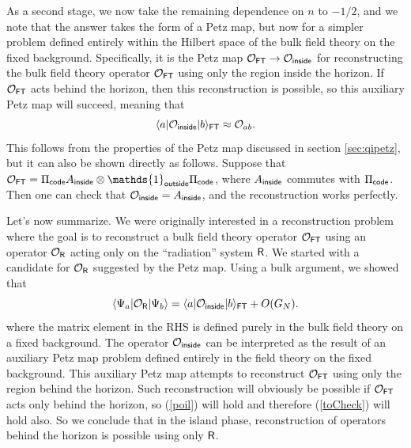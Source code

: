 \documentclass[11pt]{article}
\newcommand{\be}{\begin{equation}}
\newcommand{\ee}{\end{equation}}
\numberwithin{equation}{section}
\begin{document}
As a second stage, we now take the remaining dependence on $n$ to $-1/2$, and we note that the answer takes the form of a Petz map, but now for a simpler problem defined entirely within the Hilbert space of the bulk field theory on the fixed background. Specifically, it is the Petz map $\mathcal{O}_{\sf{FT}}\rightarrow \mathcal{O}_{\sf{inside}}$ for reconstructing the bulk field theory operator $\mathcal{O}_{\sf{FT}}$ using only the region inside the horizon. If $\mathcal{O}_{\sf{FT}}$ acts behind the horizon, then this reconstruction is possible, so this auxiliary Petz map will succeed, meaning that
\be
\langle a|\mathcal{O}_{\sf{inside}}|b\rangle_{\sf{FT}} \approx  \mathcal{O}_{ab}.\label{poil}
\ee
This follows from the properties of the Petz map discussed in section \ref{sec:qipetz}, but it can also be shown directly as follows. Suppose that $\mathcal{O}_{\sf{FT}} = \Pi_{\sf{code}}A_{\sf{inside}}\otimes \mathds{1}_{\sf{outside}}\Pi_{\sf{code}}$, where $A_{\sf{inside}}$ commutes with $\Pi_{\sf{code}}$. Then one can check that $\mathcal{O}_{\sf{inside}} = A_{\sf{inside}}$, and the reconstruction works perfectly.

Let's now summarize. We were originally interested in a reconstruction problem where the goal is to reconstruct a bulk field theory operator $\mathcal{O}_{\sf{FT}}$ using an operator $\mathcal{O}_{\sf{R}}$ acting only on the ``radiation'' system $\sf{R}$. We started with a candidate for $\mathcal{O}_{\sf{R}}$ suggested by the Petz map. Using a bulk argument, we showed that
\be
\langle \Psi_a|\mathcal{O}_{\sf{R}}|\Psi_b\rangle = \langle a|\mathcal{O}_{\sf{inside}}|b\rangle_{\sf{FT}} + O(G_N).
\ee
where the matrix element in the RHS is defined purely in the bulk field theory on a fixed background. The operator $\mathcal{O}_{\sf{inside}}$ can be interpreted as the result of an auxiliary Petz map problem defined entirely in the field theory on the fixed background. This auxiliary Petz map attempts to reconstruct $\mathcal{O}_{\sf{FT}}$ using only the region behind the horizon. Such reconstruction will obviously be possible if $\mathcal{O}_{\sf{FT}}$ acts only behind the horizon, so (\ref{poil}) will hold and therefore (\ref{toCheck}) will hold also. So we conclude that in the island phase, reconstruction of operators behind the horizon is possible using only $\sf{R}$.
\end{document}
